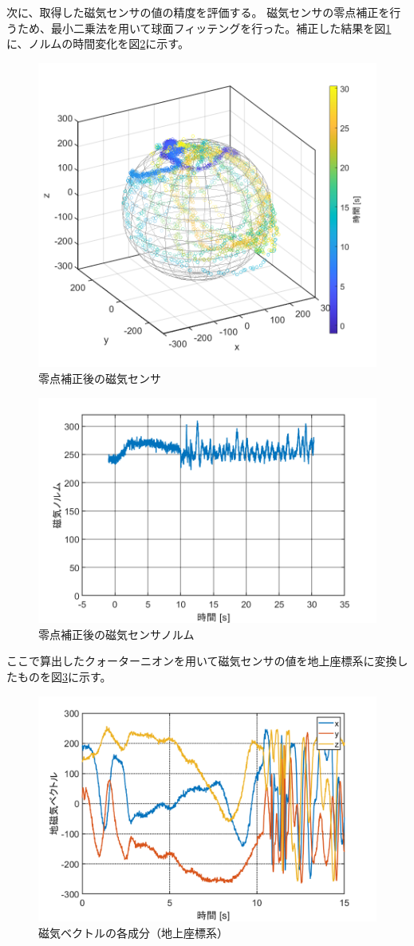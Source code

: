 \documentclass[a4paper,11pt,titlepage,uplatex]{jsarticle}
\begin{document}
次に、取得した磁気センサの値の精度を評価する。
磁気センサの零点補正を行うため、最小二乗法を用いて球面フィッテングを行った。補正した結果を図\ref{fig:tiziki}に、ノルムの時間変化を図\ref{fig:tizikinorumu}に示す。


\begin{figure}[H]
    \centering
    \includegraphics[width=0.7\linewidth]{pic_sim/mag_fix.png}
    \caption{零点補正後の磁気センサ}
    \label{fig:tiziki}
\end{figure}
\begin{figure}[H]
    \centering
    \includegraphics[width=0.7\linewidth]{pic_sim/mag_norm.png}
    \caption{零点補正後の磁気センサノルム}
    \label{fig:tizikinorumu}
\end{figure}

ここで算出したクォーターニオンを用いて磁気センサの値を地上座標系に変換したものを図\ref{fig:tizikihennkann}に示す。

\begin{figure}[H]
    \centering
    \includegraphics[width=0.7\linewidth]{pic_sim/mag_rot.png}
    \caption{磁気ベクトルの各成分（地上座標系）}
    \label{fig:tizikihennkann}
\end{figure}
\end{document}

